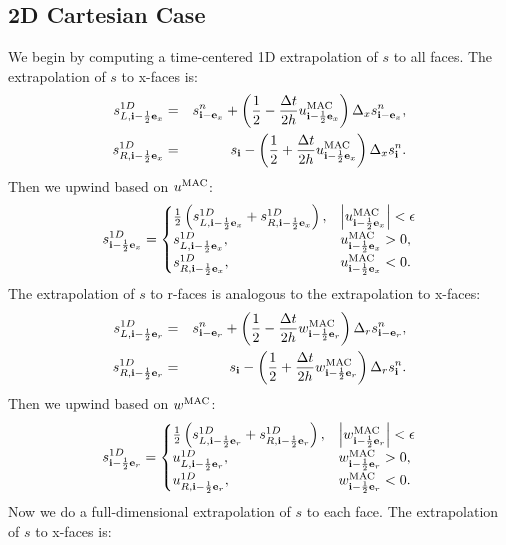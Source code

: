 \documentclass[11pt]{article}
\def\half  {\frac{1}{2}}
\def\dt    {\Delta t}
\def\mac   {\rm MAC}
\def\eb    {{\bf e}}
\def\ib    {{\bf i}}
\begin{document}
\subsection{2D Cartesian Case}
We begin by computing a time-centered 1D extrapolation of $s$ to all faces.  The extrapolation of $s$ to x-faces is:
\begin{eqnarray}
s_{L,\ib-\half\eb_x}^{1D} &=& s_{\ib-\eb_x}^n + \left(\half - \frac{\dt}{2h}u_{\ib-\half\eb_x}^{\mac}\right)\Delta_x s_{\ib-\eb_x}^n, \\
s_{R,\ib-\half\eb_x}^{1D} &=& s_{\ib} - \left(\half + \frac{\dt}{2h}u_{\ib-\half\eb_x}^{\mac}\right)\Delta_x s_{\ib}^n.
\end{eqnarray}
Then we upwind based on $u^{\mac}$:
\begin{equation}
s_{\ib-\half\eb_x}^{1D} =
\begin{cases}
\half\left(s_{L,\ib-\half\eb_x}^{1D} + s_{R,\ib-\half\eb_x}^{1D}\right), & \left|u^{\mac}_{\ib-\half\eb_x}\right| < \epsilon \\
s_{L,\ib-\half\eb_x}^{1D}, & u^{\mac}_{\ib-\half\eb_x} > 0, \\
s_{R,\ib-\half\eb_x}^{1D}, & u^{\mac}_{\ib-\half\eb_x} < 0. \\
\end{cases}
\end{equation}
The extrapolation of $s$ to r-faces is analogous to the extrapolation to x-faces:
\begin{eqnarray}
s_{L,\ib-\half\eb_r}^{1D} &=& s_{\ib-\eb_r}^n + \left(\half - \frac{\dt}{2h}w_{\ib-\half\eb_r}^{\mac}\right)\Delta_r s_{\ib-\eb_r}^n, \\
s_{R,\ib-\half\eb_r}^{1D} &=& s_{\ib} - \left(\half + \frac{\dt}{2h}w_{\ib-\half\eb_r}^{\mac}\right)\Delta_r s_{\ib}^n.
\end{eqnarray}
Then we upwind based on $w^{\mac}$:
\begin{equation}
s_{\ib-\half\eb_r}^{1D} =
\begin{cases}
\half\left(s_{L,\ib-\half\eb_r}^{1D} + s_{R,\ib-\half\eb_r}^{1D}\right), & \left|w^{\mac}_{\ib-\half\eb_r}\right| < \epsilon \\
u_{L,\ib-\half\eb_r}^{1D}, & w^{\mac}_{\ib-\half\eb_r} > 0, \\
u_{R,\ib-\half\eb_r}^{1D}, & w^{\mac}_{\ib-\half\eb_r} < 0. \\
\end{cases}
\end{equation}
Now we do a full-dimensional extrapolation of $s$ to each face.  The extrapolation of $s$ to x-faces is:
\end{document}
